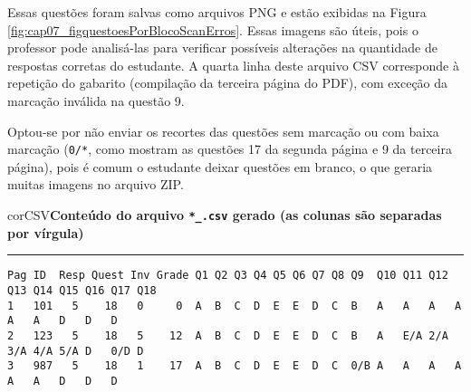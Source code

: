 Essas questões foram salvas como arquivos PNG e estão exibidas na Figura \ref{fig:cap07_figquestoesPorBlocoScanErros}. Essas imagens são úteis, pois o professor pode analisá-las para verificar possíveis alterações na quantidade de respostas corretas do estudante. A quarta linha deste arquivo CSV corresponde à repetição do gabarito (compilação da terceira página do PDF), com exceção da marcação inválida na questão 9. 

Optou-se por não enviar os recortes das questões sem marcação ou com baixa marcação (\verb|0/*|, como mostram as questões 17 da segunda página e 9 da terceira página), pois é comum o estudante deixar questões em branco, o que geraria muitas imagens no arquivo ZIP.

\begin{myboxCode}{corCSV}{\textbf{Conteúdo do arquivo \texttt{*\_.csv} gerado (as colunas são separadas por vírgula)}}\vspace{3mm}
\hrule
{\footnotesize
\begin{verbatim}
Pag ID  Resp Quest Inv Grade Q1 Q2 Q3 Q4 Q5 Q6 Q7 Q8 Q9  Q10 Q11 Q12 Q13 Q14 Q15 Q16 Q17 Q18
1   101   5    18   0     0  A  B  C  D  E  E  D  C  B   A   A   A   A   A   A   D   D   D
2   123   5    18   5    12  A  B  C  D  E  E  D  C  B   A   E/A 2/A 3/A 4/A 5/A D   0/D D
3   987   5    18   1    17  A  B  C  D  E  E  D  C  0/B A   A   A   A   A   A   D   D   D
\end{verbatim}
}
\end{myboxCode}


